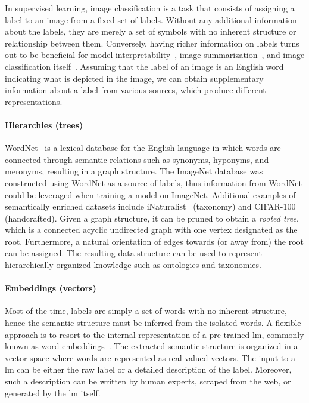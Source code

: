 In supervised learning, image classification is a task that consists of assigning a label to an image from a fixed set of labels.
Without any additional information about the labels, they are merely a set of symbols with no inherent structure or relationship between them.
Conversely, having richer information on labels turns out to be beneficial for model interpretability~\cite{ImprovingInterDong2017}, image summarization~\cite{SemanticImagePasini2022}, and image classification itself~\cite{MakingBetterMBertin2019}. Assuming that the label of an image is an English word indicating what is depicted in the image, we can obtain supplementary information about a label from various sources, which produce different representations.

\paragraph{Hierarchies (trees)}
\label{par:hierarchies-tree}
WordNet~\cite{WordnetMi1995} is a lexical database for the English language in which words are connected through semantic relations such as synonyms, hyponyms, and meronyms, resulting in a graph structure. The ImageNet database was constructed using WordNet as a source of labels, thus information from WordNet could be leveraged when training a model on ImageNet. Additional examples of semantically enriched datasets include iNaturalist~\cite{TheInaturalistHorn2017} (taxonomy) and CIFAR-100~\cite{LearningMultipKrizhe2009} (handcrafted). Given a graph structure, it can be pruned to obtain a \emph{rooted tree}, which is a connected acyclic undirected graph with one vertex designated as the root. Furthermore, a natural orientation of edges towards (or away from) the root can be assigned. The resulting data structure can be used to represent hierarchically organized knowledge such as ontologies and taxonomies.

\paragraph{Embeddings (vectors)}
\label{par:embeddings-vectors}
Most of the time, labels are simply a set of words with no inherent structure, hence the semantic structure must be inferred from the isolated words. A flexible approach is to resort to the internal representation of a pre-trained \acrfull{lm}, commonly known as word embeddings~\cite{BeyondWordEmbIncitt2023}. The extracted semantic structure is organized in a vector space where words are represented as real-valued vectors. The input to a \acrshort{lm} can be either the raw label or a detailed description of the label. Moreover, such a description can be written by human experts, scraped from the web, or generated by the \acrshort{lm} itself.\medskip

